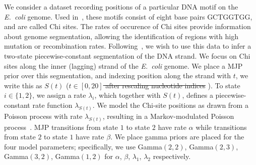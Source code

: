 {  We consider a dataset recording positions of a particular DNA motif 
  on the {\em E.\ coli} genome. Used in~\cite{FearnSher2006}, these 
  motifs consist of eight base pairs GCTGGTGG, and are called Chi sites.
  The rates of occurence of Chi sites provide information about genome 
  segmentation, allowing the identification of regions with high 
  mutation or recombination rates.
  Following~\cite{FearnSher2006}, we wish to use this data to infer a 
  two-state piecewise-constant segmentation of the DNA strand. 
  We focus on Chi sites along the inner (lagging) strand of the 
  {\em E.\ coli} genome.  We place a 
  MJP prior over this segmentation, and indexing position along the 
  strand with $t$, we write this as $S(t)$ (\sout{$t \in [0,20]$ after rescaling 
  nucleotide indices}  ). To state $i \in 
  \{1,2\}$, we assign a rate $\lambda_i$, which together with $S(t)$, 
  defines a piecewise-constant rate function $\lambda_{S(t)}$. We model 
  the Chi-site positions as drawn from a Poisson process with rate 
  $\lambda_{S(t)}$, resulting in a {Markov-modulated Poisson 
  process}~\citep{scottmmpp03}. 
  MJP transitions from state $1$ to state $2$ have rate $\alpha$ while 
  transitions from state $2$ to state $1$ have rate $\beta$. We place 
  gamma priors are placed for the four model parameters; specifically, 
  we use Gamma$(2,2)$, Gamma$(2,3)$, Gamma$(3,2)$, Gamma$(1,2)$ for 
  $\alpha$, $\beta$, $\lambda_1$, $\lambda_2$ respectively.

}
